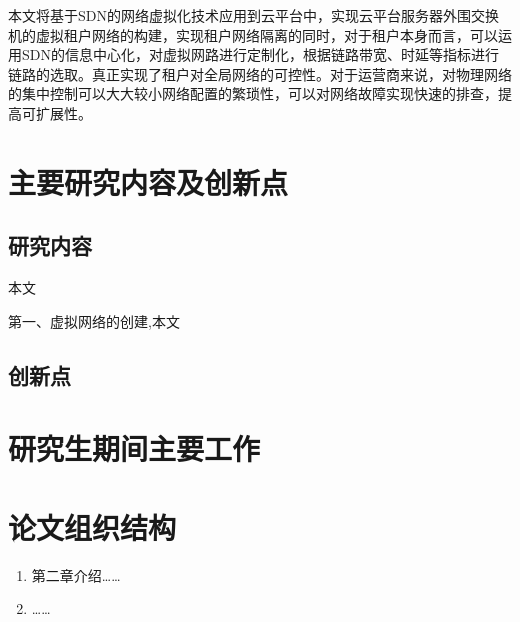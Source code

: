 本文将基于SDN的网络虚拟化技术应用到云平台中，实现云平台服务器外围交换机的虚拟租户网络的构建，实现租户网络隔离的同时，对于租户本身而言，可以运用SDN的信息中心化，对虚拟网路进行定制化，根据链路带宽、时延等指标进行链路的选取。真正实现了租户对全局网络的可控性。对于运营商来说，对物理网络的集中控制可以大大较小网络配置的繁琐性，可以对网络故障实现快速的排查，提高可扩展性。
\section{主要研究内容及创新点}
\subsection{研究内容}
本文

第一、虚拟网络的创建,本文
\subsection{创新点}
\section{研究生期间主要工作}
\section{论文组织结构}


\begin{enumerate}
\item 第二章介绍……
\item ……
\end{enumerate}

\ifx\usechapbib\empty
\nocite{BSTcontrol}
\setcounter{NAT@ctr}{0}


\fi
